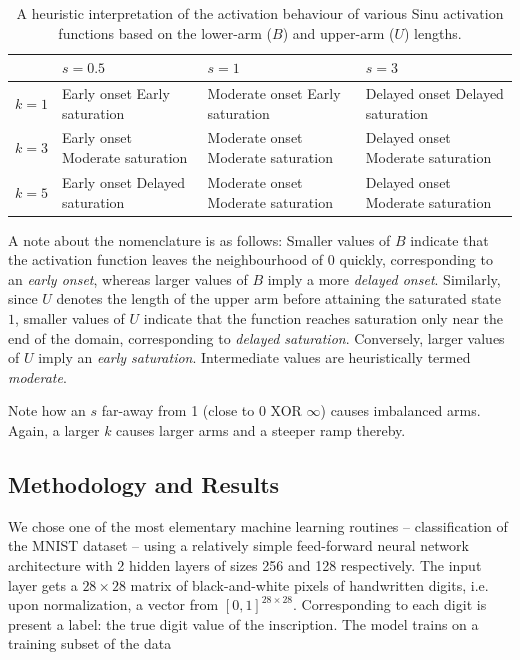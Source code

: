 \begin{table}[h!]
	\begin{tabularx}{\linewidth}{|c|X|X|X|}
		\hline
		& $s=0.5$ & $s=1$ & $s=3$ \\
		\hline
		$k=1$
		& Early onset \newline Early saturation
		& Moderate onset \newline Early saturation
		& Delayed onset \newline Delayed saturation \\
		\hline
		$k=3$
		& Early onset \newline Moderate saturation
		& Moderate onset \newline Moderate saturation
		& Delayed onset \newline Moderate saturation \\
		\hline
		$k=5$
		& Early onset \newline Delayed saturation
		& Moderate onset \newline Moderate saturation
		& Delayed onset \newline Moderate saturation \\
		\hline
	\end{tabularx}
	\caption{A heuristic interpretation of the activation behaviour of various Sinu activation functions based on the lower-arm ($B$) and upper-arm ($U$) lengths.}
	\label{tab:activationfn_vars}
\end{table}

A note about the nomenclature is as follows: Smaller values of $B$ indicate that the activation function leaves the neighbourhood of $0$ quickly, corresponding to an \emph{early onset}, whereas larger values of $B$ imply a more \emph{delayed onset}. Similarly, since $U$ denotes the length of the upper arm before attaining the saturated state $1$, smaller values of $U$ indicate that the function reaches saturation only near the end of the domain, corresponding to \emph{delayed saturation}. Conversely, larger values of $U$ imply an \emph{early saturation}. Intermediate values are heuristically termed \emph{moderate}.

Note how an $s$ far-away from 1 (close to 0 XOR $\infty$) causes imbalanced arms. Again, a larger $k$ causes larger arms and a steeper ramp thereby.


\subsection{Methodology and Results}
We chose one of the most elementary machine learning routines -- classification of the MNIST dataset -- using a relatively simple feed-forward neural network architecture with 2 hidden layers of sizes 256 and 128 respectively. The input layer gets a $28 \times 28$ matrix of black-and-white pixels of handwritten digits, i.e. upon normalization, a vector from $[0,1]^{28 \times 28}$. Corresponding to each digit is present a label: the true digit value of the inscription. The model trains on a training subset of the data

